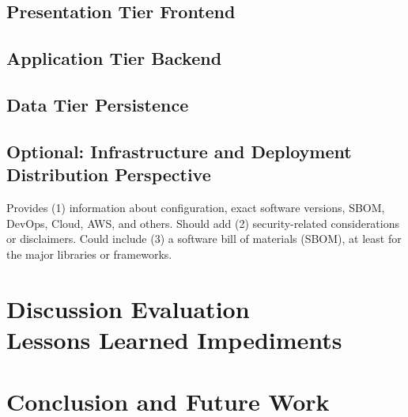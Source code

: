 \documentclass[conference,a4paper,flushend]{cs-techrep}
\begin{document}
\subsection{Presentation Tier \textbar{} Frontend}
\lipsum[3]

\subsection{Application Tier \textbar{} Backend \textbar{} }
\lipsum[4]

\subsection{Data Tier \textbar{} Persistence}
\lipsum[5]

\subsection{Optional: Infrastructure and Deployment \textbar{} Distribution Perspective \textbar{} }
Provides (1) information about configuration, exact software versions, SBOM, DevOps, Cloud, AWS, and others.
Should add (2) security-related considerations or disclaimers.
Could include (3) a software bill of materials (SBOM), at least for the major libraries or frameworks.


\section{Discussion \textbar{} Evaluation \textbar{} \\ Lessons Learned \textbar{} Impediments}
\lipsum[6]

\section{Conclusion and Future Work \textbar{} \\ }
\lipsum[7]

\nocite{ModA-TR-2023SS-WAE-TeamWeiss-Neunerln}
\nocite{ModA-TR-2023SS-BDCC-TeamRot-CompVisPipeline}
\nocite{ModA-TR-2023SS-BDCC-TeamBlau-NauticalNonsense}
\nocite{ModA-TR-2023SS-BCN-TeamGruen-TorpedoTactics}
\nocite{ModA-TR-2023SS-BCN-TeamCyan-Stockbird}
\nocite{ModA-TR-2023SS-BCN-TeamBlau-FancyChess}
\nocite{ModA-TR-2023WS-SWT-TeamRot-SGDb}
\nocite{ModA-TR-2023WS-SWT-TeamGruen-OPCUANetzwerk}
\nocite{ModA-TR-2022SS-WAE-TeamWeiss-WoIstMeinGeld}
\nocite{ModA-TR-2022SS-BDCC-TeamWeiss-TwitterDash}
\nocite{ModA-TR-2022SS-BDCC-TeamRot-Reddiment}
\nocite{ModA-TR-2022SS-BDCC-TeamGruen-ExplosionGuy}
\nocite{ModA-TR-2022SS-BDCC-TeamCyan-OTHWiki}
\nocite{ModA-TR-2022WS-SWT-TeamGruen-Graphvio}
\nocite{ModA-TR-2021SS-WAE-TeamWeiss-CovidDashboard}
\nocite{ModA-TR-2021SS-WAE-TeamRot-FireForceDefense}
\nocite{ModA-TR-2021SS-WAE-TeamGruen-MedPlanner}

\sloppy
\printbibliography[notcategory=selfref]
\end{document}
